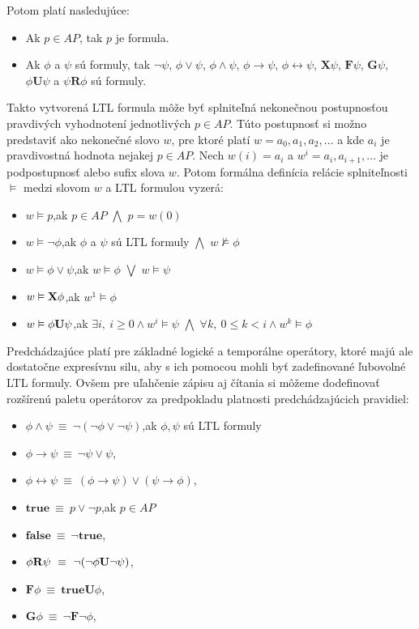 \documentclass[11pt,final,oneside]{fithesis}
\begin{document}
Potom plat\'i nasleduj\'uce:
\begin{itemize}
\item Ak $p \in AP$, tak $p$ je formula.
\item Ak $\phi$ a $\psi$ s\'u formuly, tak $\neg \psi$, $\phi \lor \psi$, $\phi \wedge \psi$, $\phi \rightarrow \psi$, $\phi \leftrightarrow \psi$, 
$\mathbf{X} \psi$, $\mathbf{F} \psi$, $\mathbf{G} \psi$, $\phi \mathbf{U} \psi$ a $\psi \mathbf{R} \phi$ s\'u formuly.
\end{itemize}
Takto vytvoren\'a LTL formula m\^ o\v ze by\v t splnite\v ln\'a nekone\v cnou postupnos\v tou pravdiv\'ych vyhodnoten\'i jednotliv\'ych $p \in AP$. 
T\'uto postupnos\v t si mo\v zno predstavi\v t ako nekone\v cn\'e slovo $w$, pre ktor\'e plat\'i $w = a_0,a_1,a_2,\dots{}$ a kde $a_i$ je pravdivostn\'a hodnota
nejakej $p \in AP$. Nech $w(i) = a_i$ a $w^i = a_i,a_{i+1},\dots{}$ je podpostupnos\v t alebo sufix slova $w$. Potom form\'alna defin\'icia rel\'acie splnite\v lnosti
$\vDash$ medzi slovom $w$ a LTL formulou vyzer\'a:
\begin{itemize}
\item $w \vDash p$,\hfil ak $p \in AP$ $\bigwedge$ $p = w(0)$
\item $w \vDash \neg\phi$,\hfil ak $\phi$ a $\psi$ s\'u LTL formuly $\bigwedge$ $w \nvDash \phi$
\item $w \vDash \phi \vee \psi$,\hfil ak $w \vDash \phi$ $\bigvee$ $w \vDash \psi$
\item $w \vDash {\bf X}\phi$,\hfil ak $w^1 \vDash \phi$
\item $w \vDash \phi {\bf U} \psi$,\hfil ak $\exists i,\ i \geq 0 \wedge w^i \vDash \psi$ $\bigwedge$ $\forall k,\ 0 \leq k < i \wedge w^k \vDash \phi$
\end{itemize}
Predch\'adzaj\'uce plat\'i pre z\'akladn\'e logick\'e a tempor\'alne oper\'atory, ktor\'e maj\'u ale dostato\v cne expres\'ivnu silu, aby s ich pomocou
mohli by\v t zadefinovan\'e \v lubovoln\'e LTL formuly. Ov\v sem pre u\v lah\v cenie z\'apisu aj \v c\'itania si m\^ o\v zeme dodefinova\v t roz\v s\'iren\'u
paletu oper\'atorov za predpokladu platnosti predch\'adzaj\'ucich pravidiel:
\begin{itemize}
\item $\phi \wedge \psi \ \equiv \ \neg(\neg \phi \vee \neg \psi)$,\hfil ak $\phi, \psi$ s\'u LTL formuly
\item $\phi \rightarrow \psi \ \equiv \ \neg \psi \vee \psi$,
\item $\phi \leftrightarrow \psi \ \equiv \ (\phi \rightarrow \psi) \vee (\psi \rightarrow \phi)$,
\item $\mathbf{true} \ \equiv \ p \vee \neg p$,\hfil ak $p \in AP$
\item $\mathbf{false} \ \equiv \ \neg\mathbf{true}$,
\item $\phi {\bf R} \psi \ \equiv \ \neg(\neg\phi{\bf U}\neg\psi)$,
\item $\mathbf{F} \phi \ \equiv \ \mathbf{true U} \phi$,
\item $\mathbf{G} \phi \ \equiv \ \neg \mathbf{F} \neg \phi$,
\end{itemize}
\end{document}
